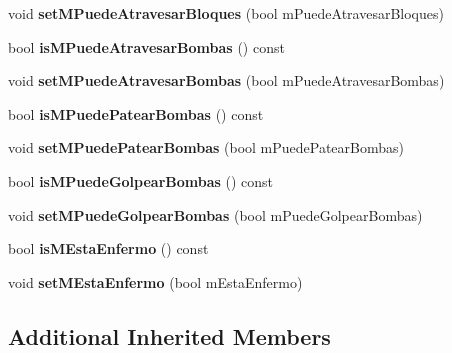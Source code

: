\begin{DoxyCompactItemize}
\item 
void {\bfseries set\+M\+Puede\+Atravesar\+Bloques} (bool m\+Puede\+Atravesar\+Bloques)\hypertarget{class_player_aeb1342f96735a7f3a8118777f68c1c8b}{}\label{class_player_aeb1342f96735a7f3a8118777f68c1c8b}

\item 
bool {\bfseries is\+M\+Puede\+Atravesar\+Bombas} () const \hypertarget{class_player_a13dc134f40ff7913e9f3ba314078ea6e}{}\label{class_player_a13dc134f40ff7913e9f3ba314078ea6e}

\item 
void {\bfseries set\+M\+Puede\+Atravesar\+Bombas} (bool m\+Puede\+Atravesar\+Bombas)\hypertarget{class_player_ac5e105bb792064c626772bba738c3b9b}{}\label{class_player_ac5e105bb792064c626772bba738c3b9b}

\item 
bool {\bfseries is\+M\+Puede\+Patear\+Bombas} () const \hypertarget{class_player_ae4a44769da079a68dbd4da1d59226714}{}\label{class_player_ae4a44769da079a68dbd4da1d59226714}

\item 
void {\bfseries set\+M\+Puede\+Patear\+Bombas} (bool m\+Puede\+Patear\+Bombas)\hypertarget{class_player_af2d924526201eb6ed6a8bb2a678ca31d}{}\label{class_player_af2d924526201eb6ed6a8bb2a678ca31d}

\item 
bool {\bfseries is\+M\+Puede\+Golpear\+Bombas} () const \hypertarget{class_player_a6456c38b4c106501efed62dc813a97fe}{}\label{class_player_a6456c38b4c106501efed62dc813a97fe}

\item 
void {\bfseries set\+M\+Puede\+Golpear\+Bombas} (bool m\+Puede\+Golpear\+Bombas)\hypertarget{class_player_a48471b29d034672dfd91fc2e7cdf6c69}{}\label{class_player_a48471b29d034672dfd91fc2e7cdf6c69}

\item 
bool {\bfseries is\+M\+Esta\+Enfermo} () const \hypertarget{class_player_aa366faf3ecfb3d1b75b0264d0c7bd1da}{}\label{class_player_aa366faf3ecfb3d1b75b0264d0c7bd1da}

\item 
void {\bfseries set\+M\+Esta\+Enfermo} (bool m\+Esta\+Enfermo)\hypertarget{class_player_a2ae08dd55f74b24cb49082c28a2ca79f}{}\label{class_player_a2ae08dd55f74b24cb49082c28a2ca79f}

\end{DoxyCompactItemize}
\subsection*{Additional Inherited Members}


